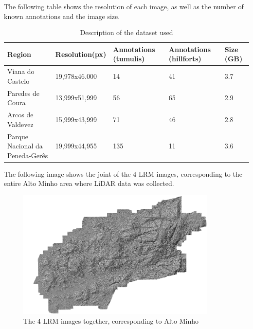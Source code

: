 The following table shows the resolution of each image, as well as the number of known annotations and the image size.

\begin{table}[h!]
\centering
\begin{tabular}{|p{3cm}|p{2.5cm}|p{2cm}|p{2cm}|p{2cm}|} 
 \hline
  Region & Resolution(px) & Annotations (tumulis) & Annotations (hillforts) & Size (GB) \\ [0.5ex] 
 \hline\hline
 Viana do Castelo & 19,978x46.000 & 14 & 41 & 3.7\\ 
 Paredes de Coura & 13,999x51,999 & 56 & 65 & 2.9 \\
 Arcos de Valdevez & 15,999x43,999 & 71 & 46 & 2.8\\
 Parque Nacional da Peneda-Gerês & 19,999x44,955 & 135 & 11 & 3.6\\ [1ex] 
 \hline
\end{tabular}
\caption{Description of the dataset used}
\end{table}

The following image shows the joint of the 4 LRM images, corresponding to the entire Alto Minho area where LiDAR data was collected.

\begin{figure}[H]
\centering
\includegraphics[width=10cm]{images/LRMfinal.png}
\caption{The 4 LRM images together, corresponding to Alto Minho}
\end{figure}






